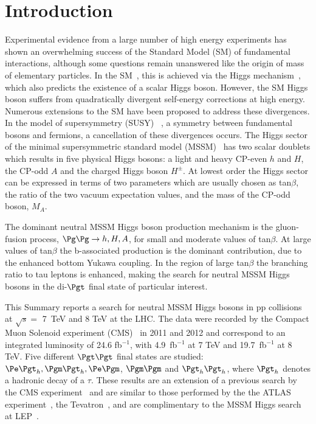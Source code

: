 \section{Introduction}
Experimental evidence from a large number of high energy experiments has shown an 
overwhelming success of the Standard Model (SM) of fundamental interactions, although 
some questions remain unanswered like the origin of mass of elementary particles. In 
the SM~\cite{SM1,SM2,SM3}, this is achieved via the Higgs 
mechanism~\cite{Englert:1964et,Higgs:1964ia,Higgs:1964pj,Guralnik:1964eu,Higgs:1966ev,Kibble:1967sv}, 
which also predicts the existence of a scalar Higgs boson. However, the SM Higgs boson 
suffers from quadratically divergent self-energy corrections at high energy. Numerous 
extensions to the SM have been proposed to address these divergences. In the model of 
supersymmetry (SUSY)~\cite{Golfand:1971iw,Wess:1974tw} , a symmetry between fundamental 
bosons and fermions, a cancellation of these divergences occurs. The Higgs sector of the 
minimal supersymmetric standard model (MSSM)~\cite{fayet1,fayet2} has two scalar doublets 
which results in five physical Higgs bosons: a light and heavy CP-even $h$ and $H$, the 
CP-odd $A$ and the charged Higgs boson $H^{\pm}$. At lowest order the Higgs sector can 
be expressed in terms of two parameters which are usually chosen as tan$\beta$, the 
ratio of the two vacuum expectation values, and the mass of the CP-odd boson, $M_A$. 

The dominant neutral MSSM Higgs boson production mechanism is the gluon-fusion process, 
$\Pg\Pg \to h, H, A$, for small and moderate values of tan$\beta$. At large values of tan$\beta$ 
the b-associated production is the dominant contribution, due to the enhanced bottom Yukawa 
coupling. In the region of large tan$\beta$ the branching ratio to tau leptons is enhanced, 
making the search for neutral MSSM Higgs bosons in the di-$\Pgt$ final state of particular interest. 

This Summary reports a search for neutral MSSM Higgs bosons in pp collisions at $\sqrt{s}=$ 7~TeV 
and 8 TeV at the LHC. The data were recorded by the Compact Muon Solenoid experiment (CMS)~\cite{CMS-JINST} 
in 2011 and 2012 and correspond to an integrated luminosity of 24.6 fb$^{-1}$, with 4.9~fb$^{-1}$ 
at 7 TeV and 19.7~fb$^{-1}$ at 8 TeV. Five different $\Pgt\Pgt$ final states are studied: 
$\Pe\Pgt_{h}, \Pgm\Pgt_{h}, \Pe\Pgm$, $\Pgm\Pgm$ and $\Pgt_{h}\Pgt_{h}$, where $\Pgt_{h}$ denotes a 
hadronic decay of a $\tau$. These results are an extension of a previous search by the CMS 
experiment~\cite{CMS-PAPER-HIG-10-002} and are similar to those performed by the the ATLAS 
experiment~\cite{Atlas-MSSM}, the Tevatron~\cite{Tevatron-MSSM, D0-MSSM, CDF-MSSM}, and are 
complimentary to the MSSM Higgs search at LEP~\cite{LEP2-MSSM}. 

